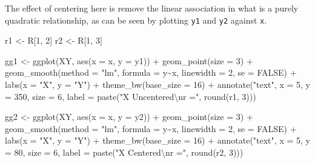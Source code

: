 \documentclass[
  letterpaper,
  10pt,
  krantz2]{krantz}
\makeatletter
\newenvironment{Shaded}{\begin{snugshade}}{\end{snugshade}}
\newcommand{\AttributeTok}[1]{\textcolor[rgb]{0.40,0.45,0.13}{#1}}
\newcommand{\ConstantTok}[1]{\textcolor[rgb]{0.56,0.35,0.01}{#1}}
\newcommand{\DecValTok}[1]{\textcolor[rgb]{0.68,0.00,0.00}{#1}}
\newcommand{\FunctionTok}[1]{\textcolor[rgb]{0.28,0.35,0.67}{#1}}
\newcommand{\NormalTok}[1]{\textcolor[rgb]{0.00,0.23,0.31}{#1}}
\newcommand{\OtherTok}[1]{\textcolor[rgb]{0.00,0.23,0.31}{#1}}
\newcommand{\SpecialCharTok}[1]{\textcolor[rgb]{0.37,0.37,0.37}{#1}}
\newcommand{\StringTok}[1]{\textcolor[rgb]{0.13,0.47,0.30}{#1}}
\newenvironment{kframe}{%
  \medskip{}
  \setlength{\fboxsep}{.8em}
  \def\at@end@of@kframe{}%
  \ifinner\ifhmode%
  \def\at@end@of@kframe{\end{minipage}}%
  \begin{minipage}{\columnwidth}%
  \fi\fi%
  \def\FrameCommand##1{\hskip\@totalleftmargin \hskip-\fboxsep
  \colorbox{shadecolor}{##1}\hskip-\fboxsep
      \hskip-\linewidth \hskip-\@totalleftmargin \hskip\columnwidth}%
  \MakeFramed {\advance\hsize-\width
    \@totalleftmargin\z@ \linewidth\hsize
    \@setminipage}}%
{\par\unskip\endMakeFramed%
  \at@end@of@kframe}
\renewenvironment{Shaded}{\begin{kframe}}{\end{kframe}}
\makeatother
\begin{document}
The effect of centering here is remove the linear association in what is
a purely quadratic relationship, as can be seen by plotting \texttt{y1}
and \texttt{y2} against \texttt{x}.

\begin{Shaded}
\begin{Highlighting}[]
\NormalTok{r1 }\OtherTok{\textless{}{-}}\NormalTok{ R[}\DecValTok{1}\NormalTok{, }\DecValTok{2}\NormalTok{]}
\NormalTok{r2 }\OtherTok{\textless{}{-}}\NormalTok{ R[}\DecValTok{1}\NormalTok{, }\DecValTok{3}\NormalTok{]}

\NormalTok{gg1 }\OtherTok{\textless{}{-}}
\FunctionTok{ggplot}\NormalTok{(XY, }\FunctionTok{aes}\NormalTok{(}\AttributeTok{x =}\NormalTok{ x, }\AttributeTok{y =}\NormalTok{ y1)) }\SpecialCharTok{+}
  \FunctionTok{geom\_point}\NormalTok{(}\AttributeTok{size =} \DecValTok{3}\NormalTok{) }\SpecialCharTok{+}
  \FunctionTok{geom\_smooth}\NormalTok{(}\AttributeTok{method =} \StringTok{"lm"}\NormalTok{, }\AttributeTok{formula =}\NormalTok{ y}\SpecialCharTok{\textasciitilde{}}\NormalTok{x, }\AttributeTok{linewidth =} \DecValTok{2}\NormalTok{, }\AttributeTok{se =} \ConstantTok{FALSE}\NormalTok{) }\SpecialCharTok{+}
  \FunctionTok{labs}\NormalTok{(}\AttributeTok{x =} \StringTok{"X"}\NormalTok{, }\AttributeTok{y =} \StringTok{"Y"}\NormalTok{) }\SpecialCharTok{+}
  \FunctionTok{theme\_bw}\NormalTok{(}\AttributeTok{base\_size =} \DecValTok{16}\NormalTok{) }\SpecialCharTok{+}
  \FunctionTok{annotate}\NormalTok{(}\StringTok{"text"}\NormalTok{, }\AttributeTok{x =} \DecValTok{5}\NormalTok{, }\AttributeTok{y =} \DecValTok{350}\NormalTok{, }\AttributeTok{size =} \DecValTok{6}\NormalTok{,}
           \AttributeTok{label =} \FunctionTok{paste}\NormalTok{(}\StringTok{"X Uncentered}\SpecialCharTok{\textbackslash{}n}\StringTok{r ="}\NormalTok{, }\FunctionTok{round}\NormalTok{(r1, }\DecValTok{3}\NormalTok{)))}

\NormalTok{gg2 }\OtherTok{\textless{}{-}}
  \FunctionTok{ggplot}\NormalTok{(XY, }\FunctionTok{aes}\NormalTok{(}\AttributeTok{x =}\NormalTok{ x, }\AttributeTok{y =}\NormalTok{ y2)) }\SpecialCharTok{+}
  \FunctionTok{geom\_point}\NormalTok{(}\AttributeTok{size =} \DecValTok{3}\NormalTok{) }\SpecialCharTok{+}
  \FunctionTok{geom\_smooth}\NormalTok{(}\AttributeTok{method =} \StringTok{"lm"}\NormalTok{, }\AttributeTok{formula =}\NormalTok{ y}\SpecialCharTok{\textasciitilde{}}\NormalTok{x, }\AttributeTok{linewidth =} \DecValTok{2}\NormalTok{, }\AttributeTok{se =} \ConstantTok{FALSE}\NormalTok{) }\SpecialCharTok{+}
  \FunctionTok{labs}\NormalTok{(}\AttributeTok{x =} \StringTok{"X"}\NormalTok{, }\AttributeTok{y =} \StringTok{"Y"}\NormalTok{) }\SpecialCharTok{+}
  \FunctionTok{theme\_bw}\NormalTok{(}\AttributeTok{base\_size =} \DecValTok{16}\NormalTok{) }\SpecialCharTok{+}
  \FunctionTok{annotate}\NormalTok{(}\StringTok{"text"}\NormalTok{, }\AttributeTok{x =} \DecValTok{5}\NormalTok{, }\AttributeTok{y =} \DecValTok{80}\NormalTok{, }\AttributeTok{size =} \DecValTok{6}\NormalTok{,}
           \AttributeTok{label =} \FunctionTok{paste}\NormalTok{(}\StringTok{"X Centered}\SpecialCharTok{\textbackslash{}n}\StringTok{r ="}\NormalTok{, }\FunctionTok{round}\NormalTok{(r2, }\DecValTok{3}\NormalTok{)))}


\end{Highlighting}
\end{Shaded}
\end{document}
